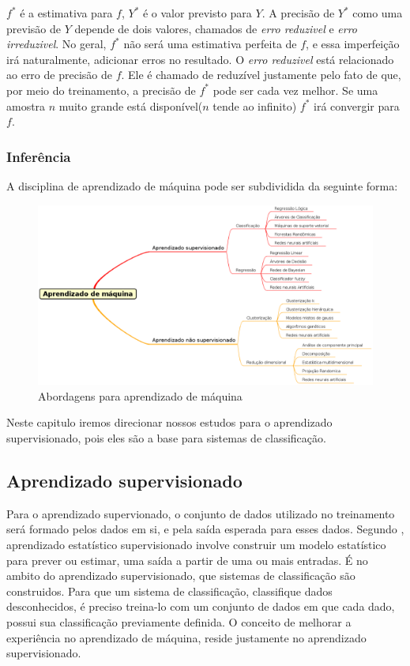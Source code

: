 $f^*$ é a estimativa para $f$, $Y^*$ é o valor previsto para $Y$. A precisão de $Y^*$ como uma previsão de $Y$ depende de dois valores, chamados de \textit{erro reduzivel} e \textit{erro irreduzivel}. No geral, $f^*$ não será uma estimativa perfeita de $f$, e essa imperfeição irá naturalmente, adicionar erros no resultado\cite{Jordan}.
O \textit{erro reduzivel} está relacionado ao erro de precisão de $f$. Ele é chamado de reduzível justamente pelo fato de que, por meio do treinamento, a precisão de $f^*$ pode ser cada vez melhor. Se uma amostra $n$ muito grande está disponível($n$ tende ao infinito) $f^*$ irá convergir para $f$\cite{Malhotra}.

\subsubsection{Inferência}


A disciplina de aprendizado de máquina pode ser subdividida da seguinte forma:
\begin{figure}[h]
	\centering
	\label{fig01}
        \includegraphics[scale=0.33]{figuras/mind1.eps}
	\caption{Abordagens para aprendizado de máquina}
\end{figure}
Neste capitulo iremos direcionar nossos estudos para o aprendizado supervisionado, pois eles são a base para sistemas de classificação.

\subsection{Aprendizado supervisionado}
Para o aprendizado supervionado, o conjunto de dados utilizado no treinamento será formado pelos dados em si, e pela saída esperada para esses dados\cite{Louridas}. Segundo \cite{James}, aprendizado estatístico supervisionado involve construir um modelo estatístico para prever ou estimar, uma saída a partir de uma ou mais entradas.  É no ambito do aprendizado supervisionado,
que sistemas de classificação são construidos. Para que um sistema de classificação, classifique dados desconhecidos, é preciso treina-lo com um conjunto de dados em que cada dado, possui sua classificação previamente definida.  O conceito de melhorar a experiência no aprendizado de máquina, reside justamente no aprendizado supervisionado.

